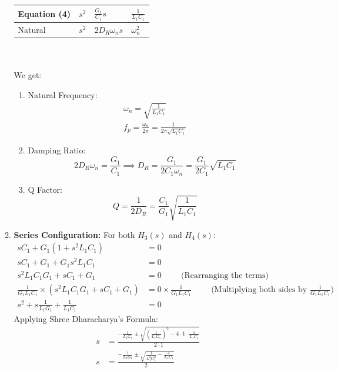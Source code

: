 \begin{enumerate}
\begin{enumerate}
\begin{tabularx}{\linewidth}{|X|X|X|X|}
          Equation (4) & \(s^2\) & \(\frac{G_1}{C_1} s\) & \(\frac{1}{L_1 C_1}\) \\ \hline
          Natural & \(s^2\) & \(2 D_R \omega_n s\) & \(\omega_n^2\) \\ \hline
        \end{tabularx}\\ \\
        We get:
        \begin{enumerate}
          \item Natural Frequency:
            \begin{align*}
              \omega_n = \sqrt{\frac{1}{L_1 C_1}} \\
              f_p = \frac{\omega_n}{2\pi} = \frac{1}{2\pi \sqrt{L_1 C_1}}
            \end{align*}
          \item Damping Ratio:
            \[
              2 D_R \omega_n = \frac{G_1}{C_1} \implies D_R = \frac{G_1}{2C_1 \omega_n} = \frac{G_1}{2 C_1} \sqrt{L_1 C_1}
            \]
          \item Q Factor:
            \[
              Q = \frac{1}{2D_R} = \frac{C_1}{G_1} \sqrt{\frac{1}{L_1 C_1}}
            \]
        \end{enumerate}
      \item \textbf{Series Configuration:}
        For both \(H_3(s)\) and \(H_4(s)\):
        \begin{align*}
          sC_1 + G_1(1 + s^2 L_1 C_1) &= 0 \\
          sC_1 + G_1 + G_1 s^2 L_1 C_1 &= 0 \\
          s^2 L_1 C_1 G_1 + s C_1 + G_1 &= 0 \hspace{1cm} \text{(Rearranging the terms)} \\
          \frac{1}{G_1 L_1 C_1} \times \left(s^2 L_1 C_1 G_1 + sC_1 + G_1\right) &= 0 \times \frac{1}{G_1 L_1 C_1} \hspace{1cm} \text{(Multiplying both sides by \(\frac{1}{G_1 L_1 C_1}\))} \\
          s^2 + s \frac{1}{L_1 G_1} + \frac{1}{L_1 C_1} &= 0 \tag{5}
        \end{align*}
        Applying Shree Dharacharya's Formula:
        \begin{align*}
          s &= \frac{-\frac{1}{L_1 G_1} \pm \sqrt{\left(\frac{1}{L_1 G_1}\right)^2 - 4 \cdot 1 \cdot \frac{1}{L_1 C_1}}}{2 \cdot 1} \\
          s &= \frac{-\frac{1}{L_1 G_1} \pm \sqrt{\frac{1}{L_1^2 G_1^2} - \frac{4}{L_1 C_1}}}{2} \\

\end{align*}
\end{enumerate}
\end{enumerate}
